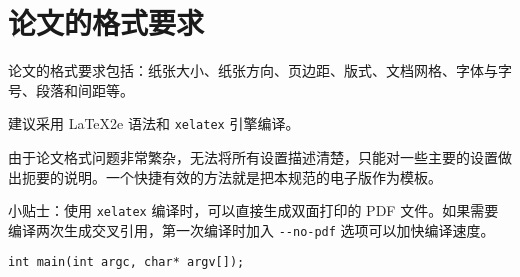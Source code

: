 \documentclass{usstthesis}
\begin{document}
\outputfrontmatter  %
    
\mainmatter %
\chapter{论文的格式要求}
\par 论文的格式要求包括：纸张大小、纸张方向、页边距、版式、文档网格、字体与字号、段落和间距等\cite{机器学习}。
\par 建议采用 \LaTeX2e 语法和 \verb|xelatex| 引擎编译。
\par 由于论文格式问题非常繁杂，无法将所有设置描述清楚，只能对一些主要的设置做出扼要的说明。一个快捷有效的方法就是把本规范的电子版作为模板。
\par 小贴士：使用 \verb|xelatex| 编译时，可以直接生成双面打印的 PDF 文件。如果需要编译两次生成交叉引用，第一次编译时加入 \verb|--no-pdf| 选项可以加快编译速度。



\begin{lstlisting}
int main(int argc, char* argv[]);
\end{lstlisting}


\backmatter %


\end{document}
